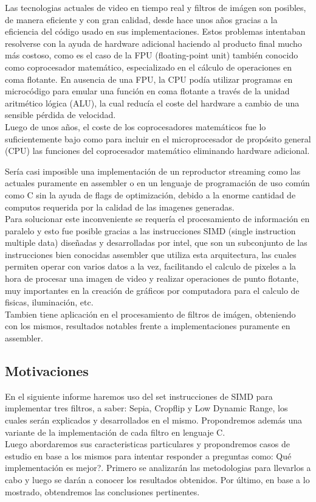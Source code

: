Las tecnologias actuales de video en tiempo real y filtros de imágen son posibles, de manera eficiente y con gran calidad, desde hace unos años gracias a la eficiencia del código usado en sus implementaciones. Estos problemas intentaban resolverse con la ayuda de hardware adicional haciendo al producto final mucho más costoso, como es el caso de la FPU (floating-point unit) también conocido como coprocesador matemático, especializado en el cálculo de operaciones en coma flotante.
En ausencia de una FPU, la CPU podía utilizar programas en microcódigo para emular una función en coma flotante a través de la unidad aritmético lógica (ALU), la cual reducía el coste del hardware a cambio de una sensible pérdida de velocidad.\\
Luego de unos años, el coste de los coprocesadores matemáticos fue lo suficientemente bajo como para incluir en el microprocesador de propósito general (CPU) las funciones del coprocesador matemático eliminando hardware adicional.

Sería casi imposible una implementación de un reproductor streaming como las actuales puramente en assembler o en un lenguaje de programación de uso común como C sin la ayuda de flags de optimización, debido a la enorme cantidad de computos requerida por la calidad de las imagenes generadas.\\

Para solucionar este inconveniente se requería el procesamiento de información en paralelo y esto fue posible gracias a las instrucciones SIMD (single instruction multiple data) diseñadas y desarrolladas por intel, que son un subconjunto de las instrucciones bien conocidas assembler que utiliza esta arquitectura, las cuales permiten operar con varios datos a la vez, facilitando el calculo de pixeles a la hora de procesar una imagen de video y realizar operaciones de punto flotante, muy importantes en la creación de gráficos por computadora para el calculo de fisicas, iluminación, etc.\\
Tambien tiene aplicación en el procesamiento de filtros de imágen, obteniendo con los mismos, resultados notables frente a implementaciones puramente en assembler.

\subsection{Motivaciones}

En el siguiente informe haremos uso del set instrucciones de SIMD para implementar tres filtros, a saber: Sepia, Cropflip y Low Dynamic Range, los cuales serán explicados y desarrollados en el mismo. Propondremos además una variante de la implementación de cada filtro en lenguaje C.\\

Luego abordaremos sus caracteristicas particulares y propondremos casos de estudio en base a los mismos para intentar responder a preguntas como: Qué implementación es mejor?. Primero se analizarán las metodologias para llevarlos a cabo y luego se darán a conocer los resultados obtenidos. Por último, en base a lo mostrado, obtendremos las conclusiones pertinentes.
